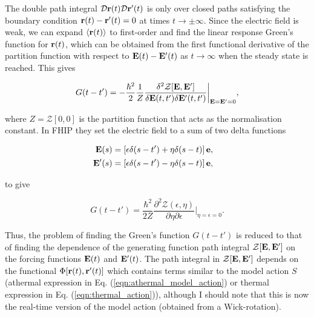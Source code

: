 The double path integral $\mathcal{D}\vb{r}(t) \mathcal{D}\vb{r'}(t)$ is only over closed paths satisfying the boundary condition $\vb{r}(t) - \vb{r'}(t) = 0$ at times $t \to \pm \infty$. Since the electric field is weak, we can expand $\langle \vb{r} (t) \rangle$ to first-order and find the linear response Green's function for $\vb{r}(t)$, which can be obtained from the first functional derivative of the partition function with respect to $\vb{E}(t) - \vb{E'}(t)$ as $t \to \infty$ when the steady state is reached. This gives

\begin{equation}
    G(t - t') = - \frac{\hbar^2}{2} \frac{1}{Z} \frac{\delta^2 \mathcal{Z}[\vb{E}, \vb{E'}]}{\delta \vb{E}(t, t') \delta \vb{E'}(t, t')} \biggr\rvert_{\vb{E}=\vb{E'} = 0},
\end{equation}

where $Z = \mathcal{Z}[0, 0]$ is the partition function that acts as the normalisation constant. In FHIP they set the electric field to a sum of two delta functions

\begin{subequations}
    \begin{align}
        \begin{split}
            \vb{E}(s) &= \left[\epsilon \delta(s - t') + \eta \delta(s - t)\right] \vb{e},
        \end{split}\\
        \begin{split}
            \vb{E'}(s) &= \left[\epsilon \delta(s - t') - \eta \delta(s - t)\right] \vb{e},
        \end{split}
    \end{align}
\end{subequations}

to give

\begin{equation}
    G(t - t') = \frac{\hbar^2}{2Z}\frac{\partial^2 \mathcal{Z}(\epsilon, \eta)}{\partial\eta\partial\epsilon} \biggr\rvert_{\eta=\epsilon=0}.
\end{equation}

Thus, the problem of finding the Green's function $G(t - t')$ is reduced to that of finding the dependence of the generating function path integral $\mathcal{Z[\vb{E}, \vb{E'}]}$ on the forcing functions $\vb{E}(t)$ and $\vb{E'}(t)$. The path integral in $\mathcal{Z[\vb{E}, \vb{E'}]}$ depends on the functional $\Phi[\vb{r}(t), \vb{r'}(t)]$ which contains terms similar to the model action $S$ (athermal expression in Eq. (\ref{eqn:athermal_model_action}) or thermal expression in Eq. (\ref{eqn:thermal_action})), although I should note that this is now the real-time version of the model action (obtained from a Wick-rotation). 

